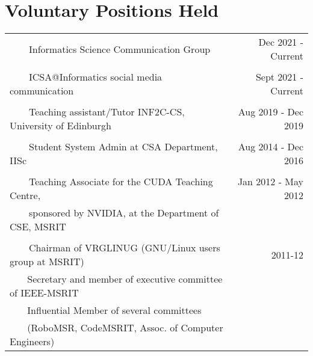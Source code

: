 \documentclass[a4paper,10pt]{article} %
\newcommand{\tabitem}{~~\llap{\textbullet}~~}
\begin{document}
\section{Voluntary Positions Held}

\begin{tabular}{lr}
	\tabitem Informatics Science Communication Group & Dec 2021 - Current \\
	&\\
	\tabitem ICSA@Informatics social media communication & Sept 2021 - Current \\
	& \\
	\tabitem Teaching assistant/Tutor INF2C-CS, University of Edinburgh & Aug 2019 - Dec 2019 \\
	& \\
	\tabitem Student System Admin at CSA Department, IISc & Aug 2014 - Dec 2016 \\
	&\\
	\tabitem Teaching Associate for the CUDA Teaching Centre,  & Jan 2012 - May 2012\\
	~~~~sponsored by NVIDIA, at the Department of CSE, MSRIT &  \\
	&\\
	\tabitem Chairman of VRGLINUG (GNU/Linux users group at MSRIT) & 2011-12 \\
	~~~ Secretary and member of executive committee of IEEE-MSRIT &  \\
	~~~ Influential Member of several committees & \\
	~~~ {\footnotesize (RoboMSR, CodeMSRIT, Assoc. of Computer Engineers)} & \\
\end{tabular}

\end{document}
